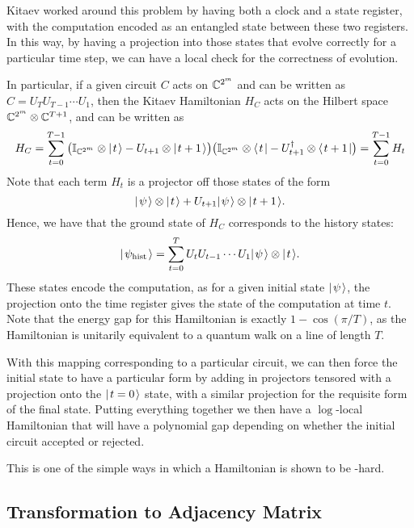 \documentclass[../thesis-main/thesis-main]{subfiles}
\begin{document}
Kitaev worked around this problem by having both a clock and a state register, with the computation encoded as an entangled state between these two registers.  In this way, by having a projection into those states that evolve correctly for a particular time step, we can have a local check for the correctness of evolution.

In particular, if a given circuit $C$ acts on $\mathbb{C}^{2^m}$ and can be written as $C = U_{T}U_{T-1} \cdots U_1$, then the Kitaev Hamiltonian $H_C$ acts on the Hilbert space $\mathbb{C}^{2^m}\otimes \mathbb{C}^{T+1}$, and can be written as
\begin{equation}
  H_C = \sum_{t=0}^{T-1} \big(\mathbb{I}_{\mathbb{C}^{2^m}}\otimes |\mspace{2mu} t \mspace{2mu} \rangle - U_{t+1} \otimes |\mspace{2mu} t+1 \mspace{2mu} \rangle\big) \big(\mathbb{I}_{\mathbb{C}^{2^m}}\otimes \langle\mspace{2mu} t \mspace{2mu} | - U_{t+1}^\dag \otimes \langle\mspace{2mu} t+1 \mspace{2mu} |\big) = \sum_{t=0}^{T-1} H_t
\end{equation}
Note that each term $H_t$ is a projector off those states of the form
\begin{equation}
  |\mspace{2mu} \psi \mspace{2mu} \rangle \otimes |\mspace{2mu} t \mspace{2mu} \rangle + U_{t+1} |\mspace{2mu} \psi \mspace{2mu} \rangle \otimes |\mspace{2mu} t+1 \mspace{2mu} \rangle.
\end{equation}
Hence, we have that the ground state of $H_C$ corresponds to the history states:
\begin{equation}
  |\mspace{2mu} \psi_\text{hist} \mspace{2mu} \rangle = \sum_{t=0}^T U_t U_{t-1} \cdots U_1 |\mspace{2mu} \psi \mspace{2mu} \rangle \otimes |\mspace{2mu} t \mspace{2mu} \rangle.
\end{equation}
These states encode the computation, as for a given initial state $|\mspace{2mu} \psi \mspace{2mu} \rangle$, the projection onto the time register gives the state of the computation at time $t$.  Note that the energy gap for this Hamiltonian is exactly $1 - \cos(\pi/T)$, as the Hamiltonian is unitarily equivalent to a quantum walk on a line of length $T$.

With this mapping corresponding to a particular circuit, we can then force the initial state to have a particular form by adding in projectors tensored with a projection onto the $|\mspace{2mu} t=0 \mspace{2mu} \rangle$ state, with a similar projection for the requisite form of the final state.  Putting everything together we then have a $\log$-local Hamiltonian that will have a polynomial gap depending on whether the initial circuit accepted or rejected.

This is one of the simple ways in which a Hamiltonian is shown to be \QMA-hard.

\subsection{Transformation to Adjacency Matrix}
\end{document}
